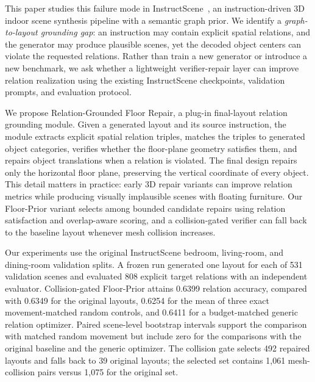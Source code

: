 \documentclass{egpubl}
\newcommand{\method}{Relation-Grounded Floor Repair}
\newcommand{\fp}{Floor-Prior}
\begin{document}
This paper studies this failure mode in InstructScene~\cite{lin2024instructscene}, an instruction-driven 3D indoor scene synthesis pipeline with a semantic graph prior. We identify a \emph{graph-to-layout grounding gap}: an instruction may contain explicit spatial relations, and the generator may produce plausible scenes, yet the decoded object centers can violate the requested relations. Rather than train a new generator or introduce a new benchmark, we ask whether a lightweight verifier-repair layer can improve relation realization using the existing InstructScene checkpoints, validation prompts, and evaluation protocol.

We propose \method, a plug-in final-layout relation grounding module. Given a generated layout and its source instruction, the module extracts explicit spatial relation triples, matches the triples to generated object categories, verifies whether the floor-plane geometry satisfies them, and repairs object translations when a relation is violated. The final design repairs only the horizontal floor plane, preserving the vertical coordinate of every object. This detail matters in practice: early 3D repair variants can improve relation metrics while producing visually implausible scenes with floating furniture. Our \fp{} variant selects among bounded candidate repairs using relation satisfaction and overlap-aware scoring, and a collision-gated verifier can fall back to the baseline layout whenever mesh collision increases.

Our experiments use the original InstructScene bedroom, living-room, and dining-room validation splits. A frozen run generated one layout for each of 531 validation scenes and evaluated 808 explicit target relations with an independent evaluator. Collision-gated \fp{} attains 0.6399 relation accuracy, compared with 0.6349 for the original layouts, 0.6254 for the mean of three exact movement-matched random controls, and 0.6411 for a budget-matched generic relation optimizer. Paired scene-level bootstrap intervals support the comparison with matched random movement but include zero for the comparisons with the original baseline and the generic optimizer. The collision gate selects 492 repaired layouts and falls back to 39 original layouts; the selected set contains 1,061 mesh-collision pairs versus 1,075 for the original set.
\end{document}
